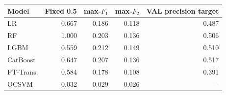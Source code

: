 \begin{tabular}{@{}l r r r r@{}}
\toprule
Model & Fixed 0.5 & max-$F_1$ & max-$F_2$ & VAL precision target \\
\midrule
LR & 0.667 & 0.186 & 0.118 & 0.487 \\
RF & 1.000 & 0.203 & 0.136 & 0.506 \\
LGBM & 0.559 & 0.212 & 0.149 & 0.510 \\
CatBoost & 0.647 & 0.207 & 0.136 & 0.517 \\
FT-Trans. & 0.584 & 0.178 & 0.108 & 0.391 \\
OCSVM & 0.032 & 0.029 & 0.026 & --- \\
\bottomrule
\end{tabular}
